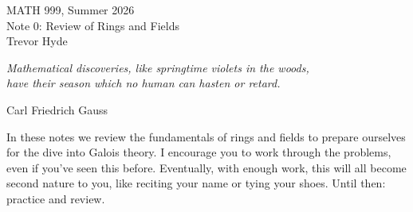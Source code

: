 \documentclass[11pt]{article}
\theoremstyle{definition}
\numberwithin{equation}{subsection}
\newcommand{\head}[1]{
	\begin{center}
		{\large #1}
		\vspace{.05 in}
	\end{center}
	\bigskip 
}
\begin{document}
\pagestyle{plain}

\setcounter{section}{0}   

\head{MATH 999, Summer 2026\\ Note 0: Review of Rings and Fields\\
Trevor Hyde}


\begin{center}
        \emph{Mathematical discoveries, like springtime violets in the woods,\\ have their season which no human can hasten or retard.}
    \vspace{.1in}

    Carl Friedrich Gauss
\end{center}
\vspace{.1in}

In these notes we review the fundamentals of rings and fields to prepare ourselves for the dive into Galois theory.
I encourage you to work through the problems, even if you've seen this before.
Eventually, with enough work, this will all become second nature to you, like reciting your name or tying your shoes.
Until then: practice and review.
\end{document}
